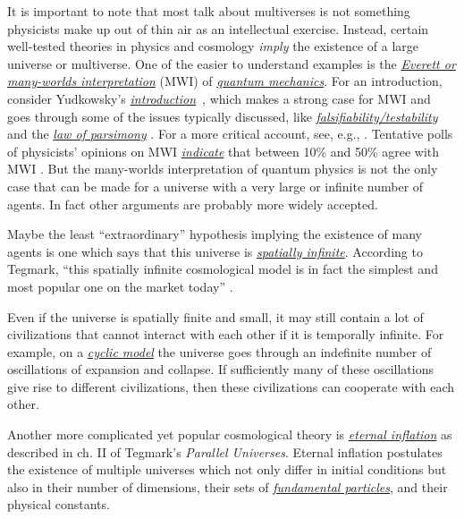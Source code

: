 It is important to note that most talk about multiverses is not
something physicists make up out of thin air as an intellectual
exercise. Instead, certain well-tested theories in physics and cosmology
\emph{imply} the existence of a large universe or multiverse. One of the
easier to understand examples is the
\href{https://en.wikipedia.org/wiki/Many-worlds_interpretation}{\emph{Everett
or many-worlds interpretation}} (MWI) of
\href{https://en.wikipedia.org/wiki/Quantum_mechanics}{\emph{quantum
mechanics}}. For an introduction, consider Yudkowsky's
\href{https://wiki.lesswrong.com/wiki/The_Quantum_Physics_Sequence}{\emph{introduction}}~\parencite{Yudkowsky2015-tz},
which makes a strong case for MWI and goes through some of the issues typically discussed, like
\href{http://lesswrong.com/lw/q4/decoherence_is_falsifiable_and_testable/}{\emph{falsifiability/testability}}
and the
\href{http://lesswrong.com/lw/pb/belief_in_the_implied_invisible/}{\emph{law
of parsimony}}
\parencite{Tegmark2001-lm,Tegmark2007-mx,Vaidman2016-cv}.
For a more critical account, see, e.g.,
\parencite{Kent1997-lm}. Tentative polls of physicists'
opinions on MWI
\href{https://en.wikipedia.org/wiki/Many-worlds_interpretation\#Polls}{\emph{indicate}}
that between 10\% and 50\% agree with MWI
\parencite{Tipler1994-di,Tegmark1997-dd,Nielsen2004-lu,Emerson2006-go}.
But the many-worlds interpretation of quantum physics is not the only
case that can be made for a universe with a very large or infinite
number of agents. In fact other arguments are probably more widely
accepted.

Maybe the least ``extraordinary'' hypothesis implying the existence of
many agents is one which says that this universe is
\href{https://en.wikipedia.org/wiki/Shape_of_the_universe}{\emph{spatially
infinite}}. According to Tegmark, ``this spatially infinite
cosmological model is in fact the simplest and most popular one on the
market today'' \parencite{Tegmark2003-sl}.

Even if the universe is spatially finite and small, it may still contain
a lot of civilizations that cannot interact with each other if it is
temporally infinite. For example, on a
\href{https://en.wikipedia.org/wiki/Cyclic_model}{\emph{cyclic model}}
the universe goes through an indefinite number of oscillations of
expansion and collapse. If sufficiently many of these oscillations give
rise to different civilizations, then these civilizations can cooperate
with each other.

Another more complicated yet popular cosmological theory is
\href{https://en.wikipedia.org/wiki/Eternal_inflation}{\emph{eternal
inflation}} as described in ch. II of Tegmark's \emph{Parallel
Universes}. Eternal inflation postulates the existence of multiple
universes which not only differ in initial conditions but also in their
number of dimensions, their sets of
\href{https://en.wikipedia.org/wiki/Elementary_particle}{\emph{fundamental
particles}}, and their physical constants.

